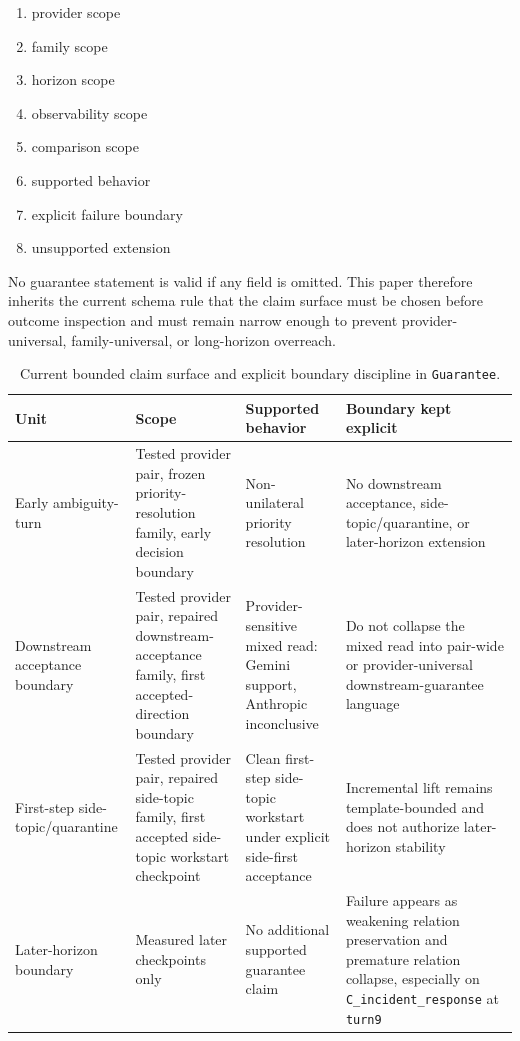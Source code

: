 \documentclass[11pt]{article}
\begin{document}
\begin{enumerate}
\item provider scope
\item family scope
\item horizon scope
\item observability scope
\item comparison scope
\item supported behavior
\item explicit failure boundary
\item unsupported extension
\end{enumerate}

No guarantee statement is valid if any field is omitted. This paper therefore
inherits the current schema rule that the claim surface must be chosen before
outcome inspection and must remain narrow enough to prevent provider-universal,
family-universal, or long-horizon overreach.

\begin{table}[ht]
\centering
\begin{tabular}{|p{}|p{}|p{}|p{}|}
\hline
\textbf{Unit} & \textbf{Scope} & \textbf{Supported behavior} & \textbf{Boundary kept explicit} \\
\hline
Early ambiguity-turn & Tested provider pair, frozen priority-resolution family, early decision boundary & Non-unilateral priority resolution & No downstream acceptance, side-topic/quarantine, or later-horizon extension \\
\hline
Downstream acceptance boundary & Tested provider pair, repaired downstream-acceptance family, first accepted-direction boundary & Provider-sensitive mixed read: Gemini support, Anthropic inconclusive & Do not collapse the mixed read into pair-wide or provider-universal downstream-guarantee language \\
\hline
First-step side-topic/quarantine & Tested provider pair, repaired side-topic family, first accepted side-topic workstart checkpoint & Clean first-step side-topic workstart under explicit side-first acceptance & Incremental lift remains template-bounded and does not authorize later-horizon stability \\
\hline
Later-horizon boundary & Measured later checkpoints only & No additional supported guarantee claim & Failure appears as weakening relation preservation and premature relation collapse, especially on \texttt{C\_incident\_response} at \texttt{turn9} \\
\hline
\end{tabular}
\caption{Current bounded claim surface and explicit boundary discipline in
\texttt{Guarantee}.}
\end{table}
\end{document}
